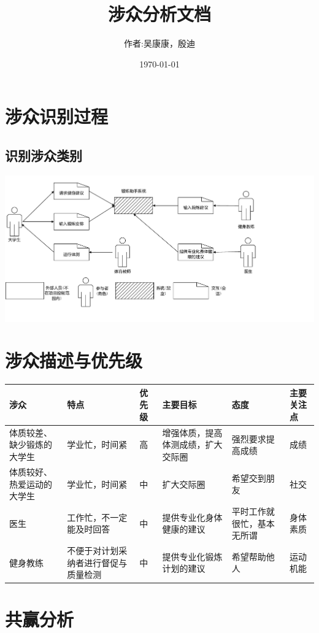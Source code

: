 \documentclass[UTF8]{ctexart}
\title{涉众分析文档}
\author{作者:吴康康，殷迪}
\date{\today}
\begin{document}
\maketitle
\section{涉众识别过程}
\subsection{识别涉众类别}
\includegraphics[scale=0.60]{figure.pdf}
\section{涉众描述与优先级}
\centering
\begin{tabular}{|p{3cm}|p{1.8cm}|p{1.2cm}|p{2.5cm}|p{2cm}|p{2cm}|}
 \hline
涉众& 特点& 优先级& 主要目标& 态度& 主要关注点\\
 \hline
体质较差、缺少锻炼的大学生 & 学业忙，时间紧 & 高 & 增强体质，提高体测成绩，扩大交际圈 & 强烈要求提高成绩 & 成绩 \\
 \hline
体质较好、热爱运动的大学生 & 学业忙，时间紧 & 中 & 扩大交际圈 &希望交到朋友 & 社交 \\
  \hline
医生 & 工作忙，不一定能及时回答 & 中 & 提供专业化身体健康的建议 & 平时工作就很忙，基本无所谓 & 身体素质 \\
   \hline
健身教练 & 不便于对计划采纳者进行督促与质量检测 & 中 & 提供专业化锻炼计划的建议 & 希望帮助他人 & 运动机能 \\
      \hline
\end{tabular}
\section{共赢分析}
\end{document}
